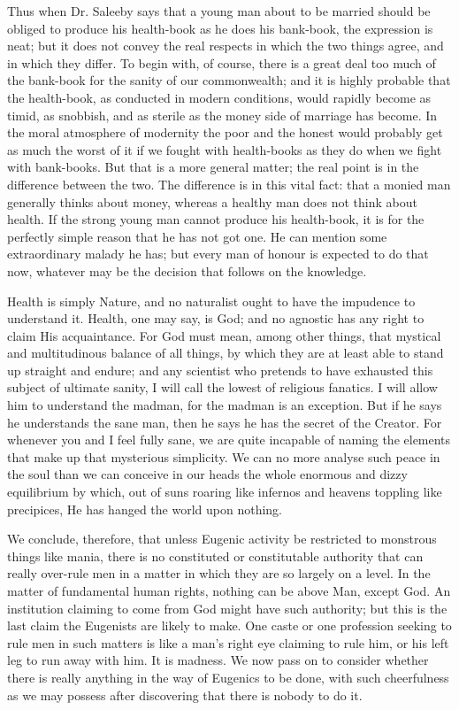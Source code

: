 \documentclass{book}
\begin{document}
Thus when Dr. Saleeby says that a young man about to be married should be obliged to produce his health-book as he does his bank-book, the expression is neat; but it does not convey the real respects in which the two things agree, and in which they differ. To begin with, of course, there is a great deal too much of the bank-book for the sanity of our commonwealth; and it is highly probable that the health-book, as conducted in modern conditions, would rapidly become as timid, as snobbish, and as sterile as the money side of marriage has become. In the moral atmosphere of modernity the poor and the honest would probably get as much the worst of it if we fought with health-books as they do when we fight with bank-books. But that is a more general matter; the real point is in the difference between the two. The difference is in this vital fact: that a monied man generally thinks about money, whereas a healthy man does not think about health. If the strong young man cannot produce his health-book, it is for the perfectly simple reason that he has not got one. He can mention some extraordinary malady he has; but every man of honour is expected to do that now, whatever may be the decision that follows on the knowledge.

Health is simply Nature, and no naturalist ought to have the impudence to understand it. Health, one may say, is God; and no agnostic has any right to claim His acquaintance. For God must mean, among other things, that mystical and multitudinous balance of all things, by which they are at least able to stand up straight and endure; and any scientist who pretends to have exhausted this subject of ultimate sanity, I will call the lowest of religious fanatics. I will allow him to understand the madman, for the madman is an exception. But if he says he understands the sane man, then he says he has the secret of the Creator. For whenever you and I feel fully sane, we are quite incapable of naming the elements that make up that mysterious simplicity. We can no more analyse such peace in the soul than we can conceive in our heads the whole enormous and dizzy equilibrium by which, out of suns roaring like infernos and heavens toppling like precipices, He has hanged the world upon nothing.

We conclude, therefore, that unless Eugenic activity be restricted to monstrous things like mania, there is no constituted or constitutable authority that can really over-rule men in a matter in which they are so largely on a level. In the matter of fundamental human rights, nothing can be above Man, except God. An institution claiming to come from God might have such authority; but this is the last claim the Eugenists are likely to make. One caste or one profession seeking to rule men in such matters is like a man’s right eye claiming to rule him, or his left leg to run away with him. It is madness. We now pass on to consider whether there is really anything in the way of Eugenics to be done, with such cheerfulness as we may possess after discovering that there is nobody to do it.
\end{document}
